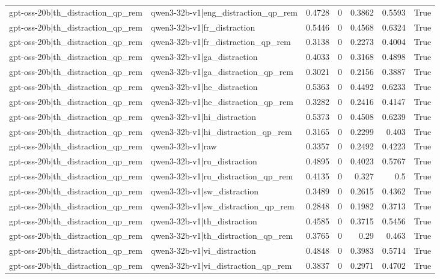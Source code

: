 \begin{table}
\begin{tabular}{l l r r r r l}
gpt-oss-20b|th_distraction_qp_rem & qwen3-32b-v1|eng_distraction_qp_rem & 0.4728 & 0 & 0.3862 & 0.5593 & True \\
gpt-oss-20b|th_distraction_qp_rem & qwen3-32b-v1|fr_distraction & 0.5446 & 0 & 0.4568 & 0.6324 & True \\
gpt-oss-20b|th_distraction_qp_rem & qwen3-32b-v1|fr_distraction_qp_rem & 0.3138 & 0 & 0.2273 & 0.4004 & True \\
gpt-oss-20b|th_distraction_qp_rem & qwen3-32b-v1|ga_distraction & 0.4033 & 0 & 0.3168 & 0.4898 & True \\
gpt-oss-20b|th_distraction_qp_rem & qwen3-32b-v1|ga_distraction_qp_rem & 0.3021 & 0 & 0.2156 & 0.3887 & True \\
gpt-oss-20b|th_distraction_qp_rem & qwen3-32b-v1|he_distraction & 0.5363 & 0 & 0.4492 & 0.6233 & True \\
gpt-oss-20b|th_distraction_qp_rem & qwen3-32b-v1|he_distraction_qp_rem & 0.3282 & 0 & 0.2416 & 0.4147 & True \\
gpt-oss-20b|th_distraction_qp_rem & qwen3-32b-v1|hi_distraction & 0.5373 & 0 & 0.4508 & 0.6239 & True \\
gpt-oss-20b|th_distraction_qp_rem & qwen3-32b-v1|hi_distraction_qp_rem & 0.3165 & 0 & 0.2299 & 0.403 & True \\
gpt-oss-20b|th_distraction_qp_rem & qwen3-32b-v1|raw & 0.3357 & 0 & 0.2492 & 0.4223 & True \\
gpt-oss-20b|th_distraction_qp_rem & qwen3-32b-v1|ru_distraction & 0.4895 & 0 & 0.4023 & 0.5767 & True \\
gpt-oss-20b|th_distraction_qp_rem & qwen3-32b-v1|ru_distraction_qp_rem & 0.4135 & 0 & 0.327 & 0.5 & True \\
gpt-oss-20b|th_distraction_qp_rem & qwen3-32b-v1|sw_distraction & 0.3489 & 0 & 0.2615 & 0.4362 & True \\
gpt-oss-20b|th_distraction_qp_rem & qwen3-32b-v1|sw_distraction_qp_rem & 0.2848 & 0 & 0.1982 & 0.3713 & True \\
gpt-oss-20b|th_distraction_qp_rem & qwen3-32b-v1|th_distraction & 0.4585 & 0 & 0.3715 & 0.5456 & True \\
gpt-oss-20b|th_distraction_qp_rem & qwen3-32b-v1|th_distraction_qp_rem & 0.3765 & 0 & 0.29 & 0.463 & True \\
gpt-oss-20b|th_distraction_qp_rem & qwen3-32b-v1|vi_distraction & 0.4848 & 0 & 0.3983 & 0.5714 & True \\
gpt-oss-20b|th_distraction_qp_rem & qwen3-32b-v1|vi_distraction_qp_rem & 0.3837 & 0 & 0.2971 & 0.4702 & True \\

\end{tabular}
\end{table}
